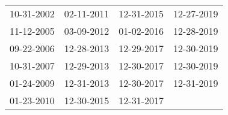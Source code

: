 \begin{supertabular}{llll}
 10-31-2002 &  02-11-2011 &  12-31-2015 &  12-27-2019 \\
 11-12-2005 &  03-09-2012 &  01-02-2016 &  12-28-2019 \\
 09-22-2006 &  12-28-2013 &  12-29-2017 &  12-30-2019 \\
 10-31-2007 &  12-29-2013 &  12-30-2017 &  12-30-2019 \\
 01-24-2009 &  12-31-2013 &  12-30-2017 &  12-31-2019 \\
 01-23-2010 &  12-30-2015 &  12-31-2017 &             \\
\end{supertabular}
